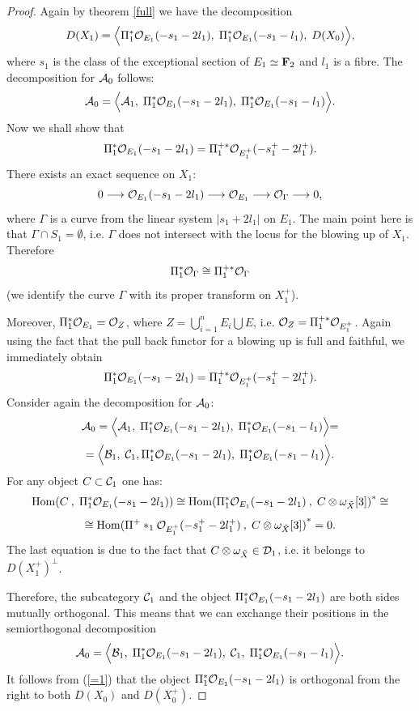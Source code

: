 \documentclass[12pt]{article}
\def\h#1,#2{{\rm Hom}({#1}\:,\; {#2})}
\def\lto{\longrightarrow}
\def\o#1{{\cal O}_{#1}}
\begin{document}
\begin{proof}
Again by theorem \ref{full} we have the decomposition
$$
D(X_1)=\Bigl\langle \Pi^*_1{\o {E_1}}(-s_1-2l_1),\; \Pi^*_1{\o {E_1}}(-s_1-l_1), \;D(X_0)\Bigl\rangle,
$$
where $s_1$ is the class of the exceptional section of $E_1\simeq{\bf F}_2$ and $l_1$ is a fibre. The decomposition for ${\cal A}_0$ follows:
$$
{\cal A}_0=\Bigl\langle {\cal A}_1,\; \Pi^*_1{\o {E_1}}(-s_1-2l_1),\; \Pi^*_1{\o {E_1}}(-s_1-l_1)\Bigl\rangle.
$$
Now we shall show that
$$
\Pi^*_1{\o {E_1}}(-s_1-2l_1)=\Pi^{+*}_1{\o {E_1^+}}(-s_1^+-2l_1^+).
$$
There exists an exact sequence on $X_1$:
$$
0\lto {\o {E_1}}(-s_1-2l_1)\lto{\o {E_1}}\lto{\o \Gamma}\lto 0,
$$
where $\Gamma$ is a curve from the linear system $|s_1+2l_1|$ on $E_1$. The main point here is that $\Gamma\cap  S_1=\emptyset$, i.e. $\Gamma$ does not intersect with the locus for the blowing up of $X_1$. Therefore
$$
\Pi^*_1{\o {\Gamma}}\cong\Pi^{+*}_1{\o {\Gamma}}
$$
(we identify the curve $\Gamma$ with its proper transform on $X^+_1$).

Moreover, $\Pi^*_1{\o {E_1}}={\o Z}$, where $Z=\bigcup^n_{i=1}E_i\bigcup E$, i.e. ${\o Z}=\Pi^{+*}_1{\o {E_1^+}}$. Again using the fact that the pull back functor for a blowing up is full and faithful, we immediately obtain
\begin{equation}\label{=1}
\Pi^*_1{\o {E_1}}(-s_1-2l_1)=\Pi^{+*}_1{\o {E_1^+}}(-s_1^+-2l_1^+).
\end{equation}
Consider again the decomposition for ${\cal A}_0$:
$$
{\cal A}_0=\Bigl\langle {\cal A}_1,\; \Pi^*_1{\o {E_1}}(-s_1-2l_1),\; \Pi^*_1{\o {E_1}}(-s_1-l_1)\Bigl\rangle=
$$
$$
=\Bigl\langle {\cal B}_1,\; {\cal C}_1, \Pi^*_1{\o {E_1}}(-s_1-2l_1),\; \Pi^*_1{\o {E_1}}(-s_1-l_1)\Bigl\rangle.
$$
For any object $C\subset{\cal C}_1$ one has:
$$
{\h C, {\Pi^*_1{\o {E_1}}(-s_1-2l_1)}}\cong{\h \Pi^*_1{\o {E_1}}(-s_1-2l_1), {C\otimes\omega_{\tilde X}[3]}}^*\cong
$$
$$
\cong{\h \Pi^{+*}_1{\o {E_1^+}}(-s_1^+-2l_1^+), {C\otimes\omega_{\tilde X}[3]}}^*=0.
$$
The last equation is due to the fact that $C\otimes\omega_{\tilde X}\in{\cal D}_1$, i.e. it belongs to $D(X^+_1)^{\perp}$.

Therefore, the subcategory ${\cal C}_1$ and the object $ \Pi^*_1{\o {E_1}}(-s_1-2l_1)$ are both sides mutually orthogonal. This means that we can exchange their positions in the semiorthogonal decomposition
$$
{\cal A}_0=\Bigl\langle {\cal B}_1,\;  \Pi^*_1{\o {E_1}}(-s_1-2l_1),\; {\cal C}_1, \;\Pi^*_1{\o {E_1}}(-s_1-l_1)\Bigl\rangle .
$$
It follows from (\ref{=1}) that the object $\Pi^*_1{\o {E_1}}(-s_1-2l_1)$ is orthogonal from the right to both $D(X_0)$ and $D(X_0^+)$.


\end{proof}
\end{document}
